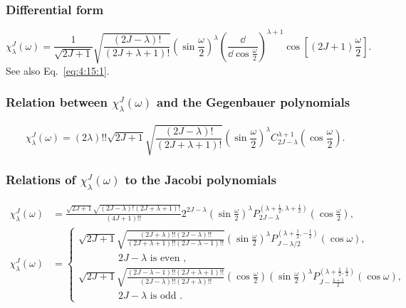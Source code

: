 \subsubsection{ Differential form}
\begin{equation}
\chi_{\lambda}^{J}(\omega)=\frac{1}{\sqrt{2 J+1}} \sqrt{\frac{(2 J-\lambda)!}{(2 J+\lambda+1)!}}\left(\sin \frac{\omega}{2}\right)^{\lambda}\left(\frac{\dd}{\dd \cos \frac{\omega}{2}}\right)^{\lambda+1} \cos \left[(2 J+1) \frac{\omega}{2}\right]. \label{eq:4:15:5}
\end{equation}
See also Eq.~\eqref{eq:4:15:1}.\\
\subsubsection{ Relation between $\chi_{\lambda}^{J}(\omega)$ and the Gegenbauer polynomials}
\begin{equation}
\chi_{\lambda}^{J}(\omega)=(2 \lambda)!!\sqrt{2 J+1} \sqrt{\frac{(2 J-\lambda)!}{(2 J+\lambda+1)!}}\left(\sin \frac{\omega}{2}\right)^{\lambda} C_{2 J-\lambda}^{\lambda+1}\left(\cos \frac{\omega}{2}\right) .\label{eq:4:15:6}
\end{equation}
\subsubsection{Relations of $\chi_{\lambda}^{J}(\omega)$ to the Jacobi polynomials}
\begin{align}
\chi_{\lambda}^{J}(\omega)&=\frac{\sqrt{2 J+1} \sqrt{(2 J-\lambda)!(2 J+\lambda+1)!}}{(4 J+1)!!} 2^{2 J-\lambda}\left(\sin \frac{\omega}{2}\right)^{\lambda} P_{2 J-\lambda}^{\left(\lambda+\frac{1}{2}, \lambda+\frac{1}{2}\right)}\left(\cos \frac{\omega}{2}\right)  ,\label{eq:4:15:7}\\
 \chi_{\lambda}^{J}(\omega)&=\left\{\begin{array}{l}
\sqrt{2 J+1} \sqrt{\frac{(2 J+\lambda)!!(2 J-\lambda)!!}{(2 J+\lambda+1)!!(2 J-\lambda-1)!!}}\left(\sin \frac{\omega}{2}\right)^{\lambda} P_{J-\lambda / 2}^{\left(\lambda+\frac{1}{2},-\frac{1}{2}\right)}(\cos \omega), \\
\qquad\qquad\text{$2 J-\lambda$ is even },\\
\sqrt{2 J+1} \sqrt{\frac{(2 J-\lambda-1)!!(2 J+\lambda+1)!!}{(2 J-\lambda)!!(2 J+\lambda)!!}}\left(\cos \frac{\omega}{2}\right)\left(\sin \frac{\omega}{2}\right)^{\lambda} P_{J-\frac{\lambda+1}{2}}^{\left(\lambda+\frac{1}{2}, \frac{1}{2}\right)}(\cos \omega),\\
 \qquad\qquad\text{$2 J-\lambda$ is odd }.
\end{array}\right. \label{eq:4:15:8}
\end{align}
